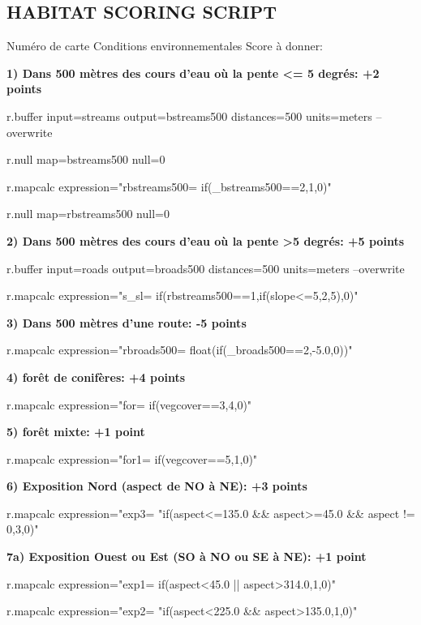 \subsection{HABITAT SCORING SCRIPT}

Num\'ero de carte Conditions environnementales Score \`a donner:

\noindent \textbf{
1) Dans 500 m\`etres des cours d'eau o\`u la pente <= 5 degr\'es: +2 points}
\begin{smallverbatim}
r.buffer input=streams output=bstreams500
 distances=500 units=meters --overwrite

r.null map=bstreams500 null=0

r.mapcalc expression="rbstreams500=
if(_bstreams500==2,1,0)"

r.null map=rbstreams500 null=0
\end{smallverbatim}

\noindent \textbf{
2) Dans 500 m\`etres des cours d'eau o\`u la pente >5 degr\'es: +5 points}
\begin{smallverbatim}
r.buffer input=roads output=broads500 
distances=500 units=meters --overwrite

r.mapcalc expression="s_sl=
if(rbstreams500==1,if(slope<=5,2,5),0)"
\end{smallverbatim}

\noindent \textbf{
3) Dans 500 m\`etres d'une route: -5 points}
\begin{smallverbatim}
r.mapcalc expression="rbroads500=
float(if(_broads500==2,-5.0,0))"
\end{smallverbatim}

\noindent \textbf{
4) for\^et de conif\`eres: +4 points}
\begin{smallverbatim}
r.mapcalc expression="for=
if(vegcover==3,4,0)"
\end{smallverbatim}

\noindent \textbf{
5) for\^et mixte: +1 point}
\begin{smallverbatim}
r.mapcalc expression="for1=
if(vegcover==5,1,0)"
\end{smallverbatim}

\noindent \textbf{
6) Exposition Nord (aspect de NO \`a NE): +3 points}
\begin{smallverbatim}
r.mapcalc expression="exp3=
"if(aspect<=135.0 && aspect>=45.0
 && aspect != 0,3,0)"
\end{smallverbatim}

\noindent \textbf{
7a) Exposition Ouest ou Est (SO \`a NO ou SE \`a NE): +1 point}
\begin{smallverbatim}
r.mapcalc expression="exp1=
if(aspect<45.0 || aspect>314.0,1,0)"

r.mapcalc expression="exp2=
"if(aspect<225.0 && aspect>135.0,1,0)"
\end{smallverbatim}

